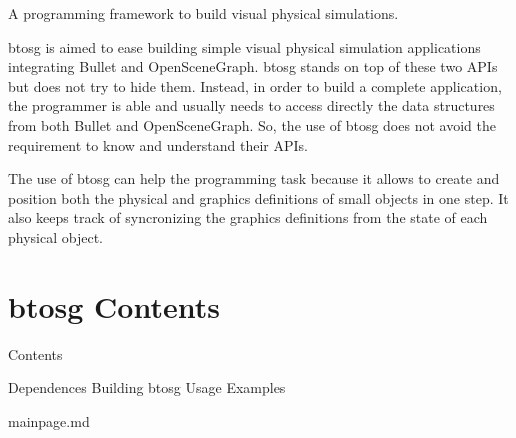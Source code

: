 A programming framework to build visual physical simulations.

btosg is aimed to ease building simple visual physical simulation applications integrating Bullet and Open\+Scene\+Graph. btosg stands on top of these two A\+P\+Is but does not try to hide them. Instead, in order to build a complete application, the programmer is able and usually needs to access directly the data structures from both Bullet and Open\+Scene\+Graph. So, the use of btosg does not avoid the requirement to know and understand their A\+P\+Is.

The use of btosg can help the programming task because it allows to create and position both the physical and graphics definitions of small objects in one step. It also keeps track of syncronizing the graphics definitions from the state of each physical object.\hypertarget{index_contents}{}\section{btosg Contents}\label{index_contents}
Contents

Dependences Building btosg Usage Examples

mainpage.\+md 